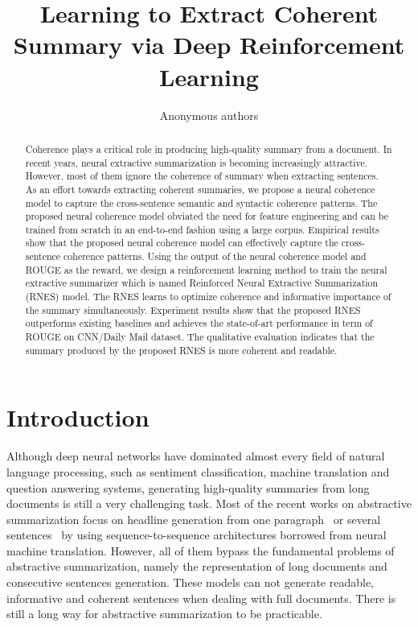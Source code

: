 \documentclass[letterpaper]{article} %
\begin{document}
	\title{Learning to Extract Coherent Summary via Deep Reinforcement Learning}
	\author{Anonymous authors}
	\maketitle
	\begin{abstract}
		 Coherence plays a critical role in producing high-quality summary from a document. In recent years, neural extractive summarization is becoming increasingly attractive. However, most of them ignore the coherence of summary when extracting sentences. As an effort towards extracting coherent summaries, we propose a neural coherence model to capture the cross-sentence semantic and syntactic coherence patterns. The proposed neural coherence model obviated the need for feature engineering and can be trained from scratch in an end-to-end fashion using a large corpus. Empirical results show that the proposed neural coherence model can effectively capture the cross-sentence coherence patterns. Using the output of the neural coherence model and ROUGE as the reward, we design a reinforcement learning method to train the neural extractive summarizer which is named Reinforced Neural Extractive Summarization (RNES) model. The RNES learns to optimize coherence and informative importance of the summary simultaneously. Experiment results show that the proposed RNES outperforms existing baselines and achieves the state-of-art performance in term of ROUGE on CNN/Daily Mail dataset. The qualitative evaluation indicates that the summary produced by the proposed RNES is more coherent and readable.
	\end{abstract}
	
	
	\section{Introduction}
	Although deep neural networks have dominated almost every field of natural language processing, such as sentiment classification\cite{duyutang-sentiment}, machine translation\cite{cho-translation} and question answering systems\cite{xiaoqiang}, generating high-quality summaries from long documents is still a very challenging task. Most of the recent works on abstractive summarization focus on headline generation from one paragraph~\cite{fb2015} or several sentences~\cite{lcsts} by using sequence-to-sequence architectures borrowed from neural machine translation. However, all of them bypass the fundamental problems of abstractive summarization, namely the representation of long documents and consecutive sentences generation. These models can not generate readable, informative and coherent sentences when dealing with full documents.  There is still a long way for abstractive summarization to be practicable.
	
\end{document}
